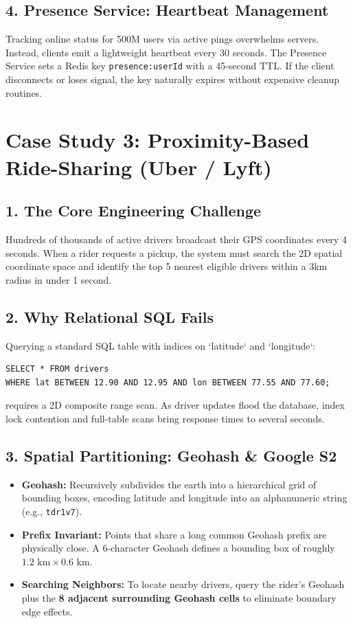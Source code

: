 \documentclass[10pt,journal,compsoc,onecolumn]{IEEEtran}
\begin{document}
\subsection{4. Presence Service: Heartbeat Management}
Tracking online status for 500M users via active pings overwhelms servers. Instead, clients emit a lightweight heartbeat every 30 seconds. The Presence Service sets a Redis key \texttt{presence:userId} with a 45-second TTL. If the client disconnects or loses signal, the key naturally expires without expensive cleanup routines.

\section{Case Study 3: Proximity-Based Ride-Sharing (Uber / Lyft)}
\label{sec:uber}

\subsection{1. The Core Engineering Challenge}
Hundreds of thousands of active drivers broadcast their GPS coordinates every 4 seconds. When a rider requests a pickup, the system must search the 2D spatial coordinate space and identify the top 5 nearest eligible drivers within a 3km radius in under 1 second.

\subsection{2. Why Relational SQL Fails}
Querying a standard SQL table with indices on `latitude` and `longitude`:
\begin{verbatim}
SELECT * FROM drivers 
WHERE lat BETWEEN 12.90 AND 12.95 AND lon BETWEEN 77.55 AND 77.60;
\end{verbatim}
requires a 2D composite range scan. As driver updates flood the database, index lock contention and full-table scans bring response times to several seconds.

\subsection{3. Spatial Partitioning: Geohash \& Google S2}
\begin{itemize}
    \item \textbf{Geohash:} Recursively subdivides the earth into a hierarchical grid of bounding boxes, encoding latitude and longitude into an alphanumeric string (e.g., \texttt{tdr1v7}).
    \item \textbf{Prefix Invariant:} Points that share a long common Geohash prefix are physically close. A 6-character Geohash defines a bounding box of roughly $1.2\text{ km} \times 0.6\text{ km}$.
    \item \textbf{Searching Neighbors:} To locate nearby drivers, query the rider's Geohash plus the \textbf{8 adjacent surrounding Geohash cells} to eliminate boundary edge effects.
\end{itemize}
\end{document}
